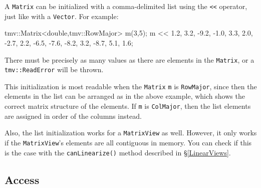 \documentclass[twoside,letterpaper,11pt]{article}
\renewcommand{\tt}[1]{{\lstinline {#1}}}
\begin{document}
A \tt{Matrix} can be initialized with a comma-delimited list using
the \tt{<<} operator, just like with a \tt{Vector}.  For example:
\begin{tmvcode}
tmv::Matrix<double,tmv::RowMajor> m(3,5);
m << 1.2,  3.2, -9.2, -1.0,  3.3, 
     2.0, -2.7,  2.2, -6.5, -7.6, 
    -8.2,  3.2, -8.7,  5.1,  1.6;
\end{tmvcode}
There must be precisely as many values as there are elements in the \tt{Matrix},
or a \tt{tmv::ReadError} will be thrown.

This initialization is most readable when the \tt{Matrix} \tt{m} is \tt{RowMajor}, since then the 
elements in the list can be arranged as in the above example, which shows the
correct matrix structure of the elements.  If \tt{m} is \tt{ColMajor}, then the
list elements are assigned in order of the columns instead.

Also, the list initialization works for a \tt{MatrixView} as well.  However, it only works
if the \tt{MatrixView}'s elements are all contiguous in memory.  You can check
if this is the case with the \tt{canLinearize()} method described in \S\ref{LinearViews}.

\subsection{Access}
\label{Matrix_Access}
\end{document}
